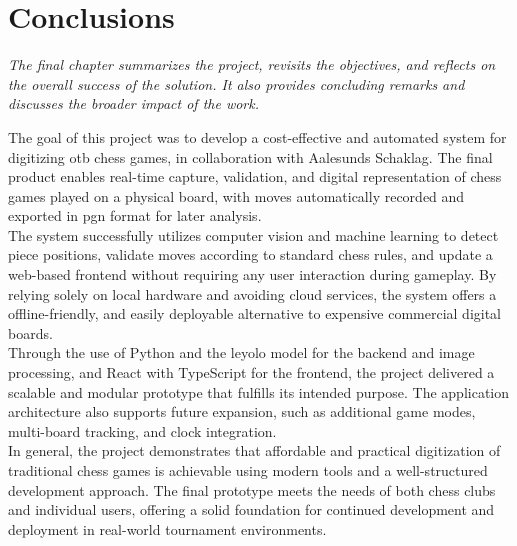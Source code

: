 \chapter{Conclusions}

\begin{center}
    \textit{The final chapter summarizes the project, revisits the objectives, and reflects on the overall success of the solution. It also provides concluding remarks and discusses the broader impact of the work.}
\end{center}

The goal of this project was to develop a cost-effective and automated system for digitizing \gls{otb} chess games, in collaboration with Aalesunds Schaklag. The final product enables real-time capture, validation, and digital representation of chess games played on a physical board, with moves automatically recorded and exported in \gls{pgn} format for later analysis. \\

The system successfully utilizes computer vision and machine learning to detect piece positions, validate moves according to standard chess rules, and update a web-based frontend without requiring any user interaction during gameplay. By relying solely on local hardware and avoiding cloud services, the system offers a offline-friendly, and easily deployable alternative to expensive commercial digital boards. \\

Through the use of Python and the \gls{leyolo} model for the backend and image processing, and React with TypeScript for the frontend, the project delivered a scalable and modular prototype that fulfills its intended purpose. The application architecture also supports future expansion, such as additional game modes, multi-board tracking, and clock integration. \\

In general, the project demonstrates that affordable and practical digitization of traditional chess games is achievable using modern tools and a well-structured development approach. The final prototype meets the needs of both chess clubs and individual users, offering a solid foundation for continued development and deployment in real-world tournament environments.